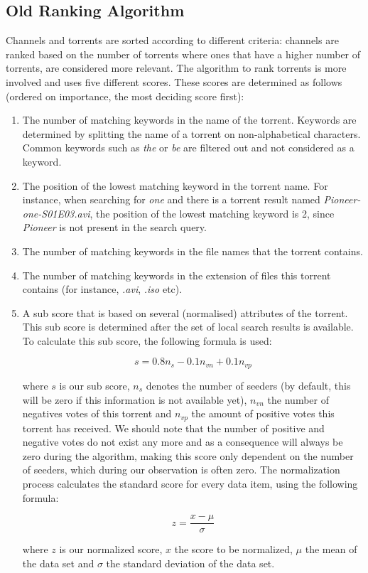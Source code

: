 \subsection{Old Ranking Algorithm}
Channels and torrents are sorted according to different criteria: channels are ranked based on the number of torrents where ones that have a higher number of torrents, are considered more relevant. The algorithm to rank torrents is more involved and uses five different scores. These scores are determined as follows (ordered on importance, the most deciding score first):
\begin{enumerate}
	\item The number of matching keywords in the name of the torrent. Keywords are determined by splitting the name of a torrent on non-alphabetical characters. Common keywords such as \emph{the} or \emph{be} are filtered out and not considered as a keyword.
	\item The position of the lowest matching keyword in the torrent name. For instance, when searching for \emph{one} and there is a torrent result named \emph{Pioneer-one-S01E03.avi}, the position of the lowest matching keyword is 2, since \emph{Pioneer} is not present in the search query.
	\item The number of matching keywords in the file names that the torrent contains.
	\item The number of matching keywords in the extension of files this torrent contains (for instance, \emph{.avi}, \emph{.iso} etc).
	\item A sub score that is based on several (normalised) attributes of the torrent. This sub score is determined after the set of local search results is available. To calculate this sub score, the following formula is used: 
	
	\begin{equation}
	\label{eq:score-old-ranking-5}
	s = 0.8n_s - 0.1n_{vn} + 0.1n_{vp}
	\end{equation}
	
	 where $ s $ is our sub score, $ n_s $ denotes the number of seeders (by default, this will be zero if this information is not available yet), $ n_{vn} $ the number of negatives votes of this torrent and $ n_{vp} $ the amount of positive votes this torrent has received. We should note that the number of positive and negative votes do not exist any more and as a consequence will always be zero during the algorithm, making this score only dependent on the number of seeders, which during our observation is often zero. The normalization process calculates the standard score for every data item, using the following formula:
	
	\begin{equation}
	\label{eq:normalization-standard-score}
	z = \frac{x - \mu}{\sigma}
	\end{equation}
	
	where $ z $ is our normalized score, $ x $ the score to be normalized, $ \mu $ the mean of the data set and $ \sigma $ the standard deviation of the data set.
	
\end{enumerate}
